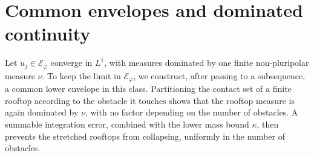 \section{Common envelopes and dominated continuity}

\label{sec:relative-common-envelope-setting}
Let $u_j\in\mathcal E_\varphi$ converge in $L^1$, with measures dominated by one finite non-pluripolar measure $\nu$. To keep the limit in $\mathcal E_\varphi$, we construct, after passing to a subsequence, a common lower envelope in this class. Partitioning the contact set of a finite rooftop according to the obstacle it touches shows that the rooftop measure is again dominated by $\nu$, with no factor depending on the number of obstacles. A summable integration error, combined with the lower mass bound $\kappa$, then prevents the stretched rooftops from collapsing, uniformly in the number of obstacles.

